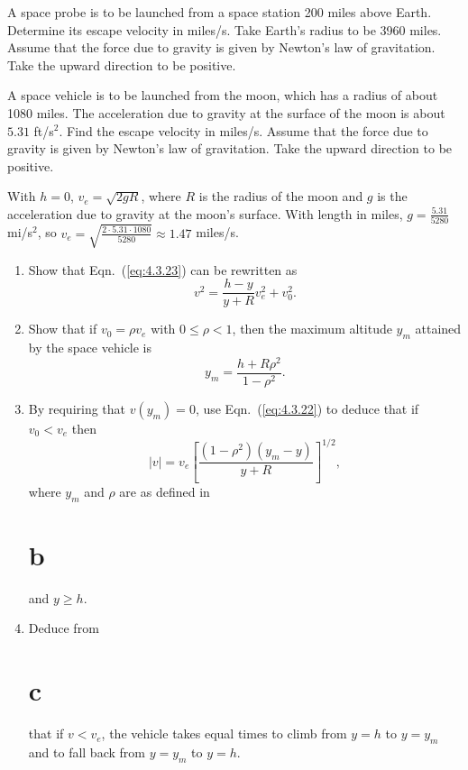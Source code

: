 \documentclass{ximera}
\begin{document}
\begin{problem}\label{exer:4.3.17}
A space probe is to be launched from a space station 200
miles above Earth.  Determine its escape velocity in
miles/s.  Take Earth's radius to be 3960 miles.  Assume
that the
force due to gravity is given by Newton's law of gravitation. Take the
upward direction to be positive.
\end{problem}

\begin{problem}\label{exer:4.3.18}
A space vehicle is to be launched from the moon, which has a
radius of about 1080 miles.  The acceleration due to
gravity at the surface of the moon is about $5.31$
ft/s$^2$.  Find the escape velocity in miles/s.  Assume
that the
force due to gravity is given by Newton's law of gravitation. Take the
upward direction to be positive.

\begin{solution}
With $h=0$, $v_e=\sqrt{2gR}$, where $R$ is the radius of the moon and
$g$ is the acceleration due to gravity at the moon's surface. With
length in miles, $g=\frac{5.31}{5280}$ mi/s$^2$, so
$v_e=\sqrt{\frac{2\cdot5.31\cdot1080}{5280}} \approx 1.47$
miles/s.
\end{solution}
\end{problem}

\begin{problem}\label{exer:4.3.19}
\begin{enumerate}
\item %
Show that Eqn.~(\ref{eq:4.3.23})  can be rewritten as
$$
v^2=\frac{h-y}{y+R} v^2_e+v_0^2.
$$
\item %
Show that if $v_0=\rho v_e$ with $ 0\le \rho < 1$, then
the maximum altitude $y_m$ attained by the space
vehicle is
$$
y_m=\frac{h+R\rho^2}{1-\rho^2}.
$$
\item %
By requiring that $v(y_m)=0$, use Eqn.~(\ref{eq:4.3.22}) to
deduce that if $v_0 < v_e$ then
$$
|v|=v_e\left[\frac{(1-\rho^2)(y_m-y)}{y+R}\right]^{1/2},
$$
where $y_m$ and $\rho$ are as defined in \part{b} and
$y \ge h$.
\item %
Deduce from \part{c} that if $v < v_e$,  the vehicle takes
equal times to climb from $y=h$ to $y=y_m$ and to
fall back from $y=y_m$ to $y=h$.
\end{enumerate}
\end{problem}
\end{document}
